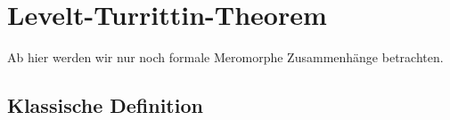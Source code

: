 \chapter{Levelt-\!Turrittin-\!Theorem}
\begin{comment}
Quellen:\\
sabbah\_cimpa90 seite 28 / 30
\end{comment}

Ab hier werden wir nur noch formale Meromorphe Zusammenhänge betrachten. 

\begin{comment}
Sei $M_{\hat{K}}=\cD_{\hat{K}}/\cD_{\hat{K}}\cdot P$ und nehme an, dass $N(P)$
zumindes 2 nichttriviale Steigungen hat. Spalte $N(P)=N_1\dot\cup N_2$ in 2
Teile. Dann gilt:

\begin{lem}
Es existiert eine Aufteilung $P=P_1P_2$ mit:
\begin{itemize}
\item $N(P_1)\subset N_1$ und $N(P_2)\subset N_2$
\item A ist eine kante von ...
\end{itemize}
\end{lem}
\end{comment}

\section{Klassische Definition}

